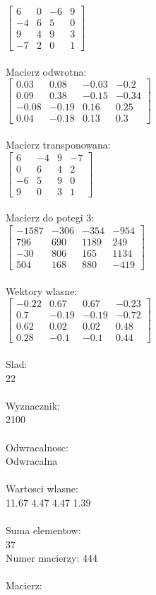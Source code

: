 \documentclass[a4paper,12pt]{article}
\begin{document}
$\begin{bmatrix} 6&0&-6&9\\-4&6&5&0\\9&4&9&3\\-7&2&0&1 \end{bmatrix}$
\\
\\
Macierz odwrotna:\\

$\begin{bmatrix} 0.03&0.08&-0.03&-0.2\\0.09&0.38&-0.15&-0.34\\-0.08&-0.19&0.16&0.25\\0.04&-0.18&0.13&0.3 \end{bmatrix}$
\\
\\
Macierz transponowana:\\

$\begin{bmatrix} 6&-4&9&-7\\0&6&4&2\\-6&5&9&0\\9&0&3&1 \end{bmatrix}$
\\
\\
Macierz do potegi 3:\\

$\begin{bmatrix} -1587&-306&-354&-954\\796&690&1189&249\\-30&806&165&1134\\504&168&880&-419 \end{bmatrix}$
\\
\\
Wektory wlasne:\\

$\begin{bmatrix} -0.22&0.67&0.67&-0.23\\0.7&-0.19&-0.19&-0.72\\0.62&0.02&0.02&0.48\\0.28&-0.1&-0.1&0.44 \end{bmatrix}$
\\
\\
Slad:\\
22
\\
\\
Wyznacznik:\\
2100
\\
\\
Odwracalnosc:\\
Odwracalna
\\
\\
Wartosci wlasne:\\
11.67 4.47 4.47 1.39
\\
\\
Suma elementow:\\
37
\\
\newpage
Numer macierzy:
444
\\
\\
Macierz:\\
\end{document}
